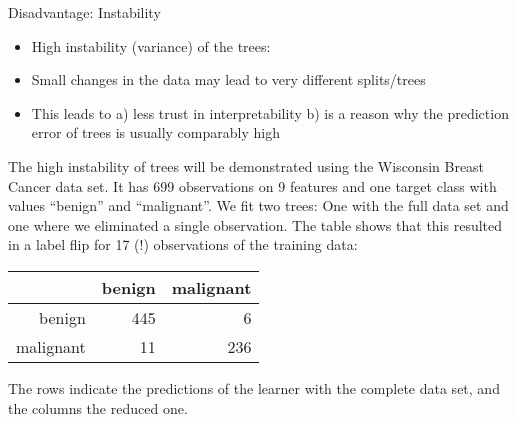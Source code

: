 \documentclass[11pt,compress,t,notes=noshow, xcolor=table]{beamer}
\begin{document}
 \begin{vbframe}{Disadvantage: Instability}
 \begin{itemize}
 \item High instability (variance) of the trees:
 \item Small changes in the data may lead to very different splits/trees
 \item This leads to a) less trust in interpretability b) is a reason why the prediction error of trees is usually comparably high
 \end{itemize}

The high instability of trees will be demonstrated using the Wisconsin Breast Cancer data set.
It has 699 observations on 9 features and one target class with values \enquote{benign} and \enquote{malignant}. We fit two trees: One with the full data set and one where we eliminated a single observation. The table shows that this resulted in a label flip for 17 (!) observations of the training data:

\begin{table}[ht]
\centering
\begin{tabular}{rrr}
  \hline
 & benign & malignant \\ 
  \hline
benign & 445 &   6 \\ 
  malignant &  11 & 236 \\ 
   \hline
\end{tabular}
\end{table}

The rows indicate the predictions of the learner with the complete data set, and the columns the reduced one.



\end{vbframe}
\end{document}
